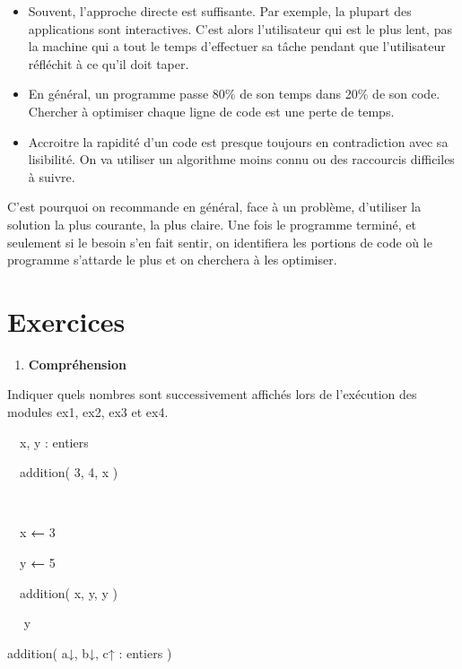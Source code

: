 {\liststyleListv
\begin{itemize}
\item {
Souvent, l'approche directe est suffisante. Par
exemple, la plupart des applications sont interactives.
C'est alors l’utilisateur qui est le plus lent, pas la
machine qui a tout le temps d'effectuer sa tâche
pendant que l’utilisateur réfléchit à ce qu'il doit
taper.}
\item {
En général, un programme passe 80\% de son temps dans 20\% de son code.
Chercher à optimiser chaque ligne de code est une perte de temps.}
\item {
Accroitre la rapidité d'un code est presque toujours en
contradiction avec sa lisibilité. On va utiliser un algorithme moins
connu ou des raccourcis difficiles à suivre.}
\end{itemize}
{
C'est pourquoi on recommande en général, face à un
problème, d'utiliser la solution la plus courante, la
plus claire. Une fois le programme terminé, et seulement si le besoin
s'en fait sentir, on identifiera les portions de code
où le programme s'attarde le plus et on cherchera à
les optimiser.}

\section[Exercices]{\bfseries Exercices}
\liststyleExercice
\begin{enumerate}
\item {\sffamily\bfseries
Compréhension}
\end{enumerate}
{
Indiquer quels nombres sont successivement affichés lors de l’exécution
des modules ex1, ex2, ex3 et ex4.}


\bigskip

{\sffamily
{}}

{\sffamily
\ \ x, y : entiers\ \ }

{\sffamily
\ \ addition( 3, 4, x )}

{\sffamily
{\ \ }}

{\sffamily
{\ \ x
}{\textbf{←}}{ 3}}

{\sffamily
{\ \ y
}{\textbf{←}}{ 5}}

{\sffamily
\ \ addition( x, y, y )}

{\sffamily
\ \  y}

{\sffamily
{}}


\bigskip

{\sffamily
{}
addition{(
a}{↓}{,
b}{↓}{,
c}{↑ :}{ entiers )}}

}
